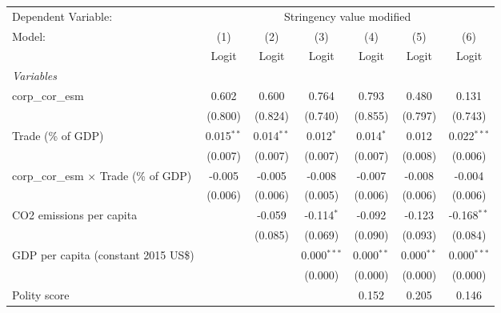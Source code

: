 
\begingroup
\centering
\begin{tabular}{lcccccc}
   \toprule
   Dependent Variable: & \multicolumn{6}{c}{Stringency value modified}\\
   Model:                                        & (1)          & (2)          & (3)           & (4)          & (5)          & (6)\\  
                                                 &  Logit       & Logit        & Logit         & Logit        & Logit        & Logit\\  
   \midrule
   \emph{Variables}\\
   corp\_cor\_esm                                & 0.602        & 0.600        & 0.764         & 0.793        & 0.480        & 0.131\\   
                                                 & (0.800)      & (0.824)      & (0.740)       & (0.855)      & (0.797)      & (0.743)\\   
   Trade (\% of GDP)                             & 0.015$^{**}$ & 0.014$^{**}$ & 0.012$^{*}$   & 0.014$^{*}$  & 0.012        & 0.022$^{***}$\\   
                                                 & (0.007)      & (0.007)      & (0.007)       & (0.007)      & (0.008)      & (0.006)\\   
   corp\_cor\_esm $\times$ Trade (\% of GDP)     & -0.005       & -0.005       & -0.008        & -0.007       & -0.008       & -0.004\\   
                                                 & (0.006)      & (0.006)      & (0.005)       & (0.006)      & (0.006)      & (0.006)\\   
   CO2 emissions per capita                      &              & -0.059       & -0.114$^{*}$  & -0.092       & -0.123       & -0.168$^{**}$\\   
                                                 &              & (0.085)      & (0.069)       & (0.090)      & (0.093)      & (0.084)\\   
   GDP per capita (constant 2015 US\$)           &              &              & 0.000$^{***}$ & 0.000$^{**}$ & 0.000$^{**}$ & 0.000$^{***}$\\   
                                                 &              &              & (0.000)       & (0.000)      & (0.000)      & (0.000)\\   
   Polity score                                  &              &              &               & 0.152        & 0.205        & 0.146\\   

\end{tabular}
